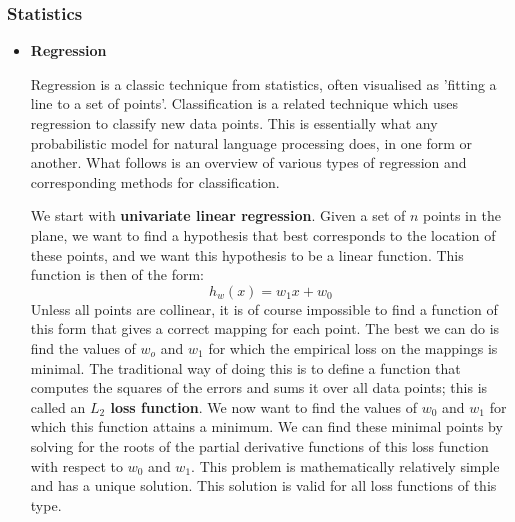 \subsubsection{Statistics}
\label{sec:statistics}
\begin{itemize}
\item { 
    \textbf{Regression}

    Regression is a classic technique from statistics, often visualised as
    'fitting a line to a set of points'. Classification is a related
    technique which uses regression to classify new data points. This is
    essentially what any probabilistic model for natural language
    processing does, in one form or another. What follows is an overview
    of various types of regression and corresponding methods for
    classification.

    We start with \textbf{univariate linear regression}. Given a set
    of $n$ points in the plane, we want to find a hypothesis that best
    corresponds to the location of these points, and we want this
    hypothesis to be a linear function. This function is then of the form:
    \begin{equation}
      h_w(x) = w_1x + w_0
    \end{equation}
    Unless all points are collinear, it is of course impossible to
    find a function of this form that gives a correct mapping for each
    point. The best we can do is find the values of $w_o$ and $w_1$ for
    which the empirical loss on the mappings is minimal. The traditional
    way of doing this is to define a function that computes the squares of
    the errors and sums it over all data points; this is called an
    \textbf{$L_2$ loss function}. We now want to find the values of $w_0$
    and $w_1$ for which this function attains a minimum. We can find these
    minimal points by solving for the roots of the partial derivative
    functions of this loss function with respect to $w_0$ and $w_1$.  This
    problem is mathematically relatively simple and has a unique
    solution. This solution is valid for all loss functions of this type.

}
\end{itemize}
